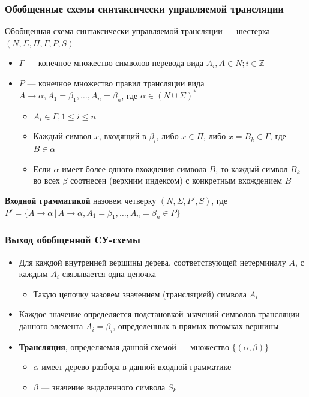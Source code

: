 \documentclass{beamer}
\begin{document}
\begin{frame}[fragile]
  \transwipe[direction=90]
  \frametitle{Обобщенные схемы синтаксически управляемой трансляции}

  \begin{center}
    Обобщенная схема синтаксически управляемой трансляции --- шестерка $(N, \Sigma, \Pi, \Gamma, P, S)$
  \end{center}

  \begin{itemize}
    \item $\Gamma$ --- конечное множество символов перевода вида $A_i, A \in N; i \in \mathbb{Z}$
    \item $P$ --- конечное множество правил трансляции вида $A \rightarrow 	\alpha, A_1 = \beta_1, \dots, A_n = \beta_n$, где $\alpha \in (N \cup \Sigma)^*$
    \begin{itemize}
      \item $A_i \in \Gamma, 1 \leq i \leq n$
      \item Каждый символ $x$, входящий в $\beta_i$, либо $x \in \Pi$, либо $x = B_k \in \Gamma$, где $B \in \alpha$
      \item Если $\alpha$ имеет более одного вхождения символа $B$, то каждый символ $B_k$ во всех $\beta$ соотнесен (верхним индексом) с конкретным вхождением $B$
    \end{itemize}
  \end{itemize}


  \begin{center}
    \textbf{Входной грамматикой} назовем четверку $(N, \Sigma, P', S)$, где $P' = \{ A \rightarrow \alpha \, | \, A \rightarrow \alpha, A_1 = \beta_1, \dots, A_n = \beta_n \in P  \}$
  \end{center}
\end{frame}

\begin{frame}[fragile]
  \transwipe[direction=90]
  \frametitle{Выход обобщенной СУ-схемы}
  \begin{itemize}
    \item Для каждой внутренней вершины дерева, соответствующей нетерминалу $A$, с каждым $A_i$ связывается одна цепочка
    \begin{itemize}
      \item Такую цепочку назовем значением (трансляцией) символа $A_i$
    \end{itemize}
    \item Каждое значение определяется подстановкой значений символов трансляции данного элемента $A_i = \beta_i$, определенных в прямых потомках вершины
    \item \textbf{Трансляция}, определяемая данной схемой --- множество $\{(\alpha, \beta)\}$
    \begin{itemize}
      \item $\alpha$ имеет дерево разбора в данной входной грамматике
      \item $\beta$ --- значение выделенного символа $S_k$
    \end{itemize}
  \end{itemize}

\end{frame}
\end{document}
